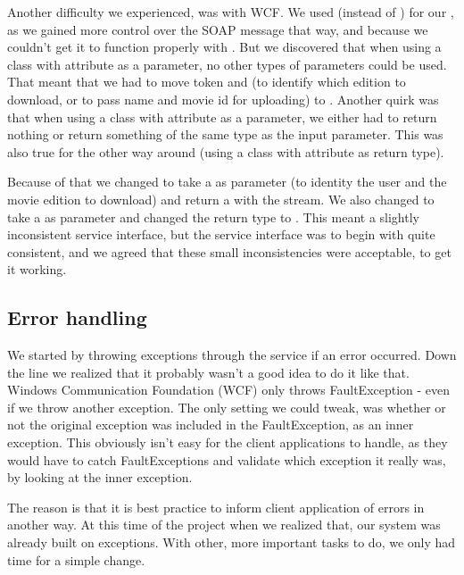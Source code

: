 Another difficulty we experienced, was with WCF. We used  (instead of ) for our , as we gained more control over the SOAP message that way, and because we couldn't get it to function properly with . But we discovered that when using a class with  attribute as a parameter, no other types of parameters could be used. That meant that we had to move token and  (to identify which edition to download, or to pass name and movie id for uploading) to . Another quirk was that when using a class with  attribute as a parameter, we either had to return nothing or return something of the same type as the input parameter. This was also true for the other way around (using a class with  attribute as return type).

Because of that we changed  to take a   as parameter (to identity the user and the movie edition to download) and return a   with the stream. We also changed  to take a  as parameter and changed the return type to . This meant a slightly inconsistent service interface, but the service interface was to begin with quite consistent, and we agreed that these small inconsistencies were acceptable, to get it working.

\subsection{Error handling}
\label{Implementation_Service_Error}

We started by throwing exceptions through the service if an error occurred. Down the line we realized that it probably wasn't a good idea to do it like that. Windows Communication Foundation (WCF) only throws FaultException - even if we throw another exception. The only setting we could tweak, was whether or not the original exception was included in the FaultException, as an inner exception. This obviously isn't easy for the client applications to handle, as they would have to catch FaultExceptions and validate which exception it really was, by looking at the inner exception.

The reason is that it is best practice to inform client application of errors in another way. At this time of the project when we realized that, our system was already built on exceptions. With other, more important tasks to do, we only had time for a simple change.

